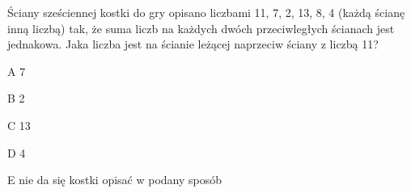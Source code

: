 \begin{tresc}
Ściany sześciennej kostki do gry opisano liczbami 11, 7, 2, 13, 8, 4 (każdą ścianę inną liczbą) tak, że suma liczb na każdych dwóch przeciwległych ścianach jest jednakowa. Jaka liczba jest na ścianie leżącej naprzeciw ściany z liczbą 11?
\end{tresc}
\begin{wariant}{A} 7 \end{wariant}
\begin{wariant}{B} 2 \end{wariant}
\begin{wariant}{C} 13 \end{wariant}
\begin{wariant}{D} 4 \end{wariant}
\begin{wariant}{E} nie da się kostki opisać w podany sposób \end{wariant}
